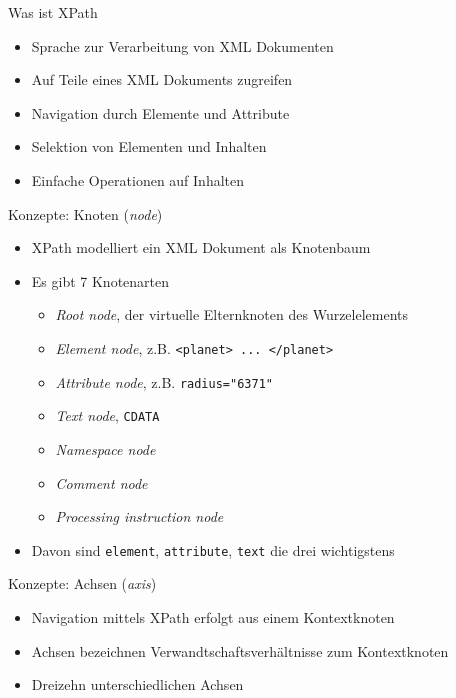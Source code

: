 \documentclass{beamer}
\begin{document}
\begin{frame}{Was ist XPath}
	
	\begin{itemize}
		\item Sprache zur Verarbeitung von XML Dokumenten
		\item Auf Teile eines XML Dokuments zugreifen
		\item Navigation durch Elemente und Attribute
		\item Selektion von Elementen und Inhalten
		\item Einfache Operationen auf Inhalten
	\end{itemize}
	
\end{frame}

\begin{frame}{Konzepte: Knoten (\emph{node})}
	
	\begin{itemize}
		\item XPath modelliert ein XML Dokument als Knotenbaum
		\item Es gibt 7 Knotenarten
		\begin{itemize}
			\item \emph{Root node}, der virtuelle Elternknoten des Wurzelelements
			\item \emph{Element node}, z.B. \texttt{<planet> ... </planet>}
			\item \emph{Attribute node}, z.B. \texttt{radius="6371"}
			\item \emph{Text node}, \texttt{CDATA}
			\item \emph{Namespace node}
			\item \emph{Comment node}
			\item \emph{Processing instruction node}
		\end{itemize}
		\item Davon sind \texttt{element}, \texttt{attribute}, \texttt{text} die drei wichtigstens
	\end{itemize}
	
\end{frame}

\begin{frame}{Konzepte: Achsen (\emph{axis})}
	
	\begin{itemize}
		\item Navigation mittels XPath erfolgt aus einem Kontextknoten
		\item Achsen bezeichnen Verwandtschaftsverhältnisse zum Kontextknoten
		\item Dreizehn unterschiedlichen Achsen
	\end{itemize}
	
\end{frame}
\end{document}
